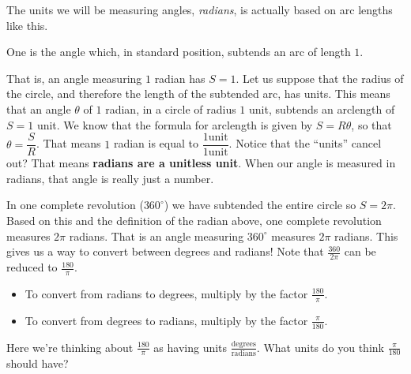 \documentclass[nooutcomes]{ximera}
\begin{document}
The units we will be measuring angles, \emph{radians}, is actually based on arc lengths like this.
\begin{definition}
	One  is the angle which, in standard position, subtends an arc of length $1$.
\end{definition}

That is, an angle measuring $1$ radian has $S = 1$. Let us suppose that the radius of the circle, and therefore the length of the subtended arc, has units.
This means that an angle $\theta$ of $1$ radian, in a circle of radius $1$ unit, subtends an arclength of $S = 1$ unit. We know that the formula for 
arclength is given by $S = R \theta$, so that $\theta = \dfrac{S}{R}$. That means $1$ radian is equal to $\dfrac{1 \textrm{unit}}{1 \textrm{unit}}$. 
Notice that the ``units'' cancel out? That means \textbf{radians are a unitless unit}. When our angle is measured in radians, that angle is really just
a number.


In one complete revolution ($360^\circ$) we have subtended the entire circle so $S = 2\pi$. 
Based on this and the definition of the radian above, 
one complete revolution measures $2\pi$ radians. That is an angle measuring $360^\circ$ measures $2\pi$ radians. This gives us a way to convert between degrees and radians! Note that $\frac{360}{2\pi}$ can be reduced to $\frac{180}{\pi}$.
\begin{callout}
	\begin{itemize}
		\item To convert from radians to degrees, multiply by the factor $\frac{180}{\pi}$. \\	
		\item	To convert from degrees to radians, multiply by the factor $\frac{\pi}{180}$.
	\end{itemize}
\end{callout}
Here we're thinking about $\frac{180}{\pi}$ as having units $\frac{\text{degrees}}{\text{radians}}$. What units do you think $\frac{\pi}{180}$ should have?
\end{document}
